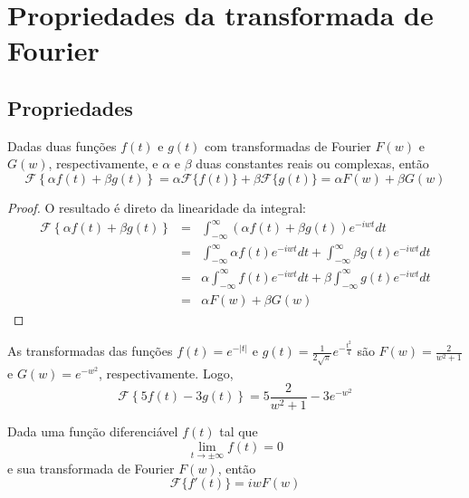 
\chapter{Propriedades da transformada de Fourier}
\section{Propriedades}
\begin{teo}\label{prop_linear}
Dadas duas funções $f(t)$ e $g(t)$ com transformadas de Fourier $F(w)$ e $G(w)$, respectivamente, e $\alpha$ e $\beta$ duas constantes reais ou complexas, então
\begin{equation}
\mathcal{F}\left\{\alpha f(t)+\beta g(t)\right\}=\alpha \mathcal{F}\{ f(t)\}+\beta\mathcal{F}\{ g(t)\}=\alpha F(w)+\beta G(w)
\end{equation}
\end{teo}
\begin{proof}
O resultado é direto da linearidade da integral:
\begin{eqnarray*}
\mathcal{F}\left\{\alpha f(t)+\beta g(t)\right\}&=&\int_{-\infty}^\infty \left(\alpha f(t)+\beta g(t)\right) e^{-iwt}dt \\
&=&\int_{-\infty}^\infty \alpha f(t)e^{-iwt}dt+\int_{-\infty}^\infty \beta g(t) e^{-iwt}dt \\
&=&\alpha\int_{-\infty}^\infty  f(t)e^{-iwt}dt+\beta\int_{-\infty}^\infty  g(t) e^{-iwt}dt \\
&=&\alpha F(w)+\beta G(w)
\end{eqnarray*}
\end{proof}
\begin{ex}As transformadas das funções $f(t)=e^{-|t|}$ e $g(t)=\frac{1}{2\sqrt{\pi}}e^{-\frac{t^2}{4}}$ são $F(w)=\frac{2}{w^2+1}$ e $G(w)=e^{-w^2}$, respectivamente. Logo,
\begin{equation}
\mathcal{F}\left\{5 f(t)-3 g(t)\right\}=5 \frac{2}{w^2+1}-3e^{-w^2}
\end{equation}
\end{ex}
\begin{teo}{\label{prop_der}} Dada uma função diferenciável $f(t)$ tal que 
\begin{equation}\lim_{t\to \pm \infty}f(t)=0
\end{equation}
e sua transformada de Fourier $F(w)$, então
\begin{equation}
\mathcal{F}\{f'(t)\}=iw F(w)
\end{equation}
\end{teo}
